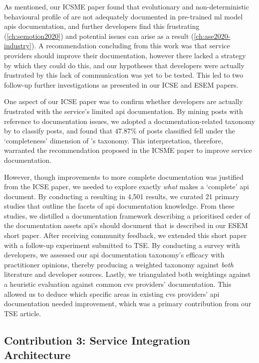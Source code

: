 As mentioned, our ICSME paper found that evolutionary and non-deterministic behavioural profile of are not adequately documented in pre-trained \gls{ml} model \glspl{api} documentation, and further developers find this frustrating (\cref{ch:semotion2020}) and potential issues can arise as a result (\cref{ch:ase2020-industry}). A recommendation concluding from this work was that service providers should improve their documentation, however there lacked a strategy by which they could do this, and our hypotheses that developers were actually frustrated by this lack of communication was yet to be tested. This led to two follow-up further investigations as presented in our ICSE and ESEM papers.

One aspect of our ICSE paper was to confirm whether developers are actually frustrated with the service's limited \gls{api} documentation. By mining  posts with reference to documentation issues, we adopted a \citeyear{Aghajani:2019bo} documentation-related taxonomy by \citet{Aghajani:2018et} to classify posts, and found that 47.87\% of posts classified fell under the `completeness' dimension of \citeauthor{Aghajani:2018et}'s taxonomy. This interpretation, therefore, warranted the recommendation proposed in the ICSME paper to improve service documentation. 

However, though improvements to more complete documentation was justified from the ICSE paper, we needed to explore exactly \textit{what} makes a `complete' \gls{api} document. By conducting a  resulting in 4,501 results, we curated 21 primary studies that outline the facets of \gls{api} documentation knowledge. From these studies, we distilled a documentation framework describing a prioritised order of the documentation assets \gls{api}'s should document that is described in our ESEM short paper. After receiving community feedback, we extended this short paper with a follow-up experiment submitted to TSE. By conducting a survey with developers, we assessed our \gls{api} documentation taxonomy's efficacy with practitioner opinions, thereby producing a weighted taxonomy against \textit{both} literature and developer sources. Lastly, we triangulated both weightings against a heuristic evaluation against common \gls{cvs} providers' documentation. This allowed us to deduce which specific areas in existing \gls{cvs} providers' \gls{api} documentation needed improvement, which was a primary contribution from our TSE article.

\subsection{Contribution 3: Service Integration Architecture}

